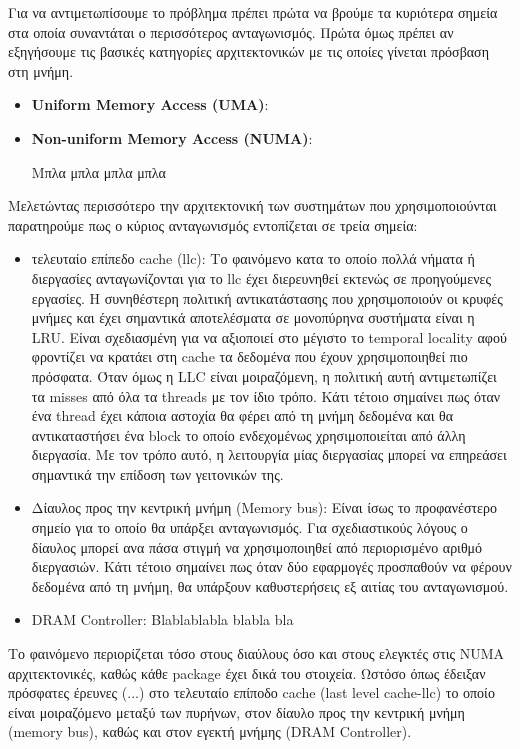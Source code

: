 Για να αντιμετωπίσουμε το πρόβλημα πρέπει πρώτα να βρούμε τα κυριότερα σημεία
στα οποία συναντάται ο περισσότερος ανταγωνισμός. Πρώτα όμως πρέπει αν
εξηγήσουμε τις βασικές κατηγορίες αρχιτεκτονικών με τις οποίες γίνεται πρόσβαση
στη μνήμη.

\begin{itemize}
	\item \textbf{Uniform Memory Access (UMA)}:

		
	\item \textbf{Non-uniform Memory Access (NUMA)}:

		Μπλα μπλα μπλα μπλα
\end{itemize}

Μελετώντας περισσότερο την αρχιτεκτονική των συστημάτων που χρησιμοποιούνται
παρατηρούμε πως ο κύριος ανταγωνισμός εντοπίζεται σε τρεία σημεία:
\begin{itemize}
	\item τελευταίο επίπεδο cache (llc): Το φαινόμενο κατα το οποίο πολλά
		νήματα ή διεργασίες ανταγωνίζονται για το llc έχει διερευνηθεί
		εκτενώς σε προηγούμενες εργασίες. Η συνηθέστερη πολιτική
		αντικατάστασης που χρησιμοποιούν οι κρυφές μνήμες και έχει
		σημαντικά αποτελέσματα σε μονοπύρηνα συστήματα είναι η LRU.
		Είναι σχεδιασμένη για να αξιοποιεί στο μέγιστο το temporal
		locality αφού φροντίζει να κρατάει στη cache τα δεδομένα που
		έχουν χρησιμοποιηθεί πιο πρόσφατα. Όταν όμως η LLC είναι
		μοιραζόμενη, η πολιτική αυτή αντιμετωπίζει τα misses από όλα τα
		threads με τον ίδιο τρόπο. Κάτι τέτοιο σημαίνει πως όταν ένα
		thread έχει κάποια αστοχία θα φέρει από τη μνήμη δεδομένα και θα
		αντικαταστήσει ένα block το οποίο ενδεχομένως χρησιμοποιείται
		από άλλη διεργασία. Με τον τρόπο αυτό, η λειτουργία μίας
		διεργασίας μπορεί να επηρεάσει σημαντικά την επίδοση των
		γειτονικών της.
	\item Δίαυλος προς την κεντρική μνήμη (Memory bus): Είναι ίσως το
		προφανέστερο σημείο για το οποίο θα υπάρξει ανταγωνισμός. Για
		σχεδιαστικούς λόγους ο δίαυλος μπορεί ανα πάσα στιγμή να
		χρησιμοποιηθεί από περιορισμένο αριθμό διεργασιών. Κάτι τέτοιο
		σημαίνει πως όταν δύο εφαρμογές προσπαθούν να φέρουν δεδομένα
		από τη μνήμη, θα υπάρξουν καθυστερήσεις εξ αιτίας του
		ανταγωνισμού.
	\item DRAM Controller: Blablablabla blabla bla
\end{itemize}

Το φαινόμενο περιορίζεται τόσο στους διαύλους όσο και στους ελεγκτές στις NUMA
αρχιτεκτονικές, καθώς κάθε package έχει δικά του στοιχεία. Ωστόσο όπως έδειξαν
πρόσφατες έρευνες (...) 
στο τελευταίο
επίποδο cache (last level cache-llc) το οποίο είναι μοιραζόμενο μεταξύ των
πυρήνων, στον δίαυλο προς την κεντρική μνήμη (memory bus), καθώς και στον εγεκτή
μνήμης (DRAM Controller).

